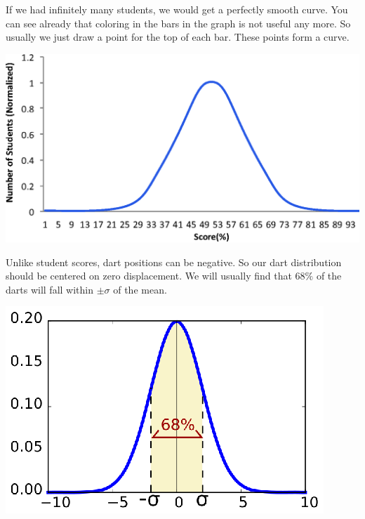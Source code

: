 \documentclass[twoside,11pt,ShortChapTitles]{BYUTextbook}
\begin{document}
If we had infinitely many students, we would get a perfectly smooth curve.
You can see already that coloring in the bars in the graph is not useful any
more. So usually we just draw a point for the top of each bar. These points
form a curve.

\begin{center}
\includegraphics[scale=0.5]{Lab2_figs/hist_smooth.eps}
\end{center}

Unlike student scores, dart positions can be negative. So our dart
distribution should be centered on zero displacement. We will usually find
that $68\%$ of the darts will fall within $\pm \sigma $ of the mean.

\begin{center}
\includegraphics[scale=1.3]{Lab2_figs/normal_68.eps}
\end{center}
\end{document}

